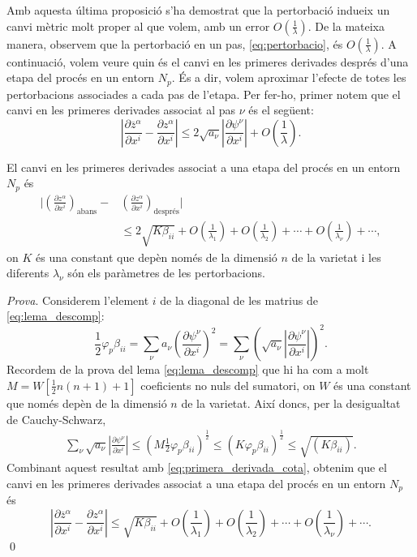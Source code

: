 Amb aquesta última proposició s'ha demostrat que la pertorbació indueix un canvi mètric molt proper al que volem, amb un error $O\left(\frac1\lambda\right)$. De la mateixa manera, observem que la pertorbació en un pas, \ref{eq:pertorbacio}, és $O\left(\frac1\lambda\right)$. A continuació, volem veure quin és el canvi en les primeres derivades després d'una etapa del procés en un entorn $N_p$. És a dir, volem aproximar l'efecte de totes les pertorbacions associades a cada pas de l'etapa. Per fer-ho, primer notem que el canvi en les primeres derivades associat al pas $\nu$ és el següent:
\begin{equation}\label{eq:primera_derivada_cota}
    \left| \frac{\partial\overline{z}^\alpha}{\partial x^i} - \frac{\partial z^\alpha}{\partial x^i} \right| \le 2\sqrt{a_\nu}\left| \frac{\partial\psi^\nu}{\partial x^i} \right| + O\left(\frac1\lambda\right).
\end{equation}
\begin{prop}
    El canvi en les primeres derivades associat a una etapa del procés en un entorn $N_p$ és
    \begin{align}
        \nonumber\Bigg| \left(\frac{\partial{z}^\alpha}{\partial x^i} \right)_{\textrm{abans}}- &\left(\frac{\partial{z}^\alpha}{\partial x^i} \right)_{\textrm{després}} \Bigg| \\
        &\le 2\sqrt{K\beta_{ii}} + O\left(\frac1{\lambda_1}\right) + O\left(\frac1{\lambda_2}\right) + \cdots + O\left(\frac1{\lambda_\nu}\right) + \cdots,
    \end{align}
    on $K$ és una constant que depèn només de la dimensió $n$ de la varietat i les diferents $\lambda_\nu$ són els paràmetres de les pertorbacions.
\end{prop}
{
\color{green!50!black}\textit{Prova}.
Considerem l'element $i$ de la diagonal de les matrius de \ref{eq:lema_descomp}:
\begin{equation*}
    \frac12\varphi_p\beta_{ii} = \sum_\nu a_\nu\left(\frac{\partial\psi^\nu}{\partial x^i}\right)^2 = \sum_\nu \left(\sqrt{a_\nu}\left|\frac{\partial\psi^\nu}{\partial x^i}\right|\right)^2.
\end{equation*}
Recordem de la prova del lema \ref{eq:lema_descomp} que hi ha com a molt $M = W[\frac12n(n+1)+1]$ coeficients no nuls del sumatori, on $W$ és una constant que només depèn de la dimensió $n$ de la varietat. Així doncs, per la desigualtat de Cauchy-Schwarz,
\begin{align*}
    \sum_\nu \sqrt{a_\nu}\left|\frac{\partial\psi^\nu}{\partial x^i}\right| 
    \le 
    \left(M\frac12\varphi_p\beta_{ii}\right)^{\frac12}
    \le
    \left(K\varphi_p\beta_{ii}\right)^{\frac12}
    \le
    \sqrt{\left(K\beta_{ii}\right)}.
\end{align*}
Combinant aquest resultat amb \ref{eq:primera_derivada_cota}, obtenim que el canvi en les primeres derivades associat a una etapa del procés en un entorn $N_p$ és
\begin{equation*}
    \left| \frac{\partial\overline{z}^\alpha}{\partial x^i} - \frac{\partial z^\alpha}{\partial x^i} \right| \le \sqrt{K\beta_{ii}} + O\left(\frac1{\lambda_1}\right) + O\left(\frac1{\lambda_2}\right) + \cdots + O\left(\frac1{\lambda_\nu}\right) + \cdots.
\end{equation*}
\qed
}
